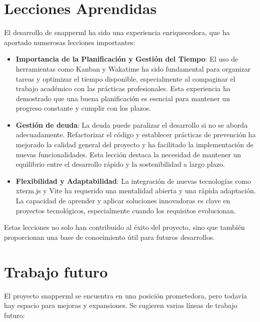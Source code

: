 \section{Lecciones Aprendidas} El desarrollo de \Gls{snapperml} ha sido una experiencia enriquecedora, que ha aportado numerosas lecciones importantes:
\begin{itemize}
    \item \textbf{Importancia de la Planificación y Gestión del Tiempo}: El uso de herramientas como Kanban y Wakatime ha sido fundamental para organizar tareas y optimizar el tiempo disponible, especialmente al compaginar el trabajo académico con las prácticas profesionales. Esta experiencia ha demostrado que una buena planificación es esencial para mantener un progreso constante y cumplir con los plazos.
    \item \textbf{Gestión de \Gls{deuda}}: La \gls{deuda} puede paralizar el desarrollo si no se aborda adecuadamente. Refactorizar el código y establecer prácticas de prevención ha mejorado la calidad general del proyecto y ha facilitado la implementación de nuevas funcionalidades. Esta lección destaca la necesidad de mantener un equilibrio entre el desarrollo rápido y la sostenibilidad a largo plazo.
    \item \textbf{Flexibilidad y Adaptabilidad}: La integración de nuevas tecnologías como xterm.js y Vite ha requerido una mentalidad abierta y una rápida adaptación. La capacidad de aprender y aplicar soluciones innovadoras es clave en proyectos tecnológicos, especialmente cuando los requisitos evolucionan.
\end{itemize}
Estas lecciones no solo han contribuido al éxito del proyecto, sino que también proporcionan una base de conocimiento útil para futuros desarrollos.

\section{Trabajo futuro}
El proyecto \Gls{snapperml} se encuentra en una posición prometedora, pero todavía hay espacio para mejoras y expansiones. Se sugieren varias líneas de trabajo futuro:

